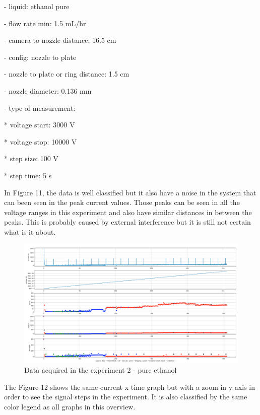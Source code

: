     - liquid: ethanol pure
    
    - flow rate min: 1.5 mL/hr
    
    - camera to nozzle distance: 16.5 cm
    
    - config: nozzle to plate
    
    - nozzle to plate or ring distance: 1.5 cm
    
    - nozzle diameter: 0.136 mm

    - type of measurement: 

        * voltage start: 3000 V

        * voltage stop: 10000 V

        * step size: 100 V 

        * step time: 5 s

    In Figure 11, the data is well classified but it also have a noise in the system that can been seen in the peak current values.
    Those peaks can be seen in all the voltage ranges in this experiment and also have similar distances in between the peaks. This is probably caused by
    external interference but it is still not certain what is it about.

    \begin{figure}[H]
        \center
        \includegraphics[width=17cm]{images/images_folder_3/data3.png}
        \caption{Data acquired in the experiment 2 - pure ethanol}
    \end{figure}

    The Figure 12 shows the same current x time graph but with a zoom in y axis in order to see the signal steps in the experiment. It is also classified by the same color legend as all graphs in this overview.



